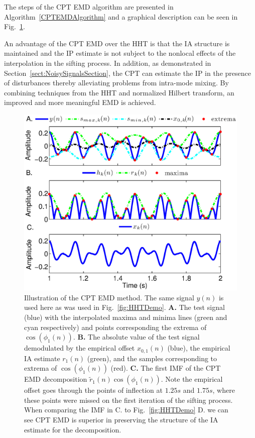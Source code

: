 \documentclass[a4paper]{IEEEtran}
\begin{document}
The steps of the CPT EMD algorithm are presented in Algorithm~\ref{CPTEMDAlgorithm} and a graphical description can be seen in Fig.~\ref{CPT_EMD}.

An advantage of the CPT EMD over the HHT is that the IA structure is maintained and the IP estimate is not subject to the nonlocal effects of the interpolation in the sifting process. In addition, as demonstrated in Section~\ref{sect:NoisySignalsSection}, the CPT can estimate the IP in the presence of disturbances thereby alleviating problems from intra-mode mixing. By combining techniques from the HHT and normalized Hilbert transform, an improved and more meaningful EMD is achieved. %
% 
\begin{figure}
\centering
\includegraphics[scale=0.42]{./Figures/CPT_EMD_demo.eps}
\caption[CPT_EMD]{Illustration of the CPT EMD method. The same signal $y(n)$ is used here as was used in Fig.~\ref{fig:HHTDemo}. \textbf{A.} The test signal (blue) with the interpolated maxima and minima lines (green and cyan respectively) and points corresponding the extrema of $\cos\left(\phi_1(n)\right)$. \textbf{B.} The absolute value of the test signal demodulated by the empirical offset $x_{0,1}(n)$ (blue), the empirical IA estimate $r_{1}(n)$ (green), and the samples corresponding to extrema of $\cos\left(\phi_1\left(n\right)\right)$ (red). \textbf{C.} The first IMF of the CPT EMD decomposition $\tilde{r}_1(n)\cos\left(\phi_1\left(n\right)\right)$. Note the empirical offset goes through the points of inflection at $1.25 s$ and $1.75s$, where these points were missed on the first iteration of the sifting process. When comparing the IMF in C. to Fig.~\ref{fig:HHTDemo} D. we can see CPT EMD is superior in preserving the structure of the IA estimate for the decomposition.}
\label{CPT_EMD}
\end{figure}
\end{document}
